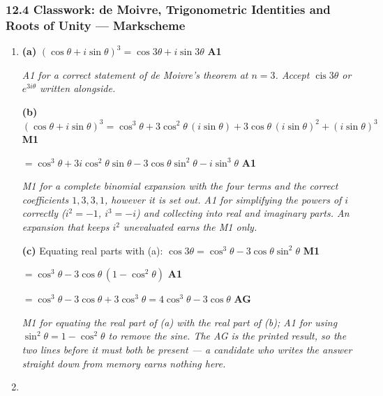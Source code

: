 \documentclass[12pt, twoside]{article}
\begin{document}
\subsubsection*{12.4 Classwork: de Moivre, Trigonometric Identities and Roots of Unity --- Markscheme}

\begin{enumerate}[itemsep=0.3cm]

\item[1.] [Maximum mark: 6]

\textbf{(a)} $(\cos\theta + i\sin\theta)^{3} = \cos 3\theta + i\sin 3\theta$
\hfill \textbf{A1}

\emph{A1 for a correct statement of de Moivre's theorem at $n = 3$. Accept
$\operatorname{cis}3\theta$ or $e^{3i\theta}$ written alongside.}

\textbf{(b)} $(\cos\theta + i\sin\theta)^{3}
= \cos^{3}\theta + 3\cos^{2}\theta\,(i\sin\theta)
+ 3\cos\theta\,(i\sin\theta)^{2} + (i\sin\theta)^{3}$ \hfill \textbf{M1}

$= \cos^{3}\theta + 3i\cos^{2}\theta\sin\theta - 3\cos\theta\sin^{2}\theta
- i\sin^{3}\theta$ \hfill \textbf{A1}

\emph{M1 for a complete binomial expansion with the four terms and the correct
coefficients $1, 3, 3, 1$, however it is set out. A1 for simplifying the powers
of $i$ correctly ($i^{2} = -1$, $i^{3} = -i$) and collecting into real and
imaginary parts. An expansion that keeps $i^{2}$ unevaluated earns the M1 only.}

\textbf{(c)} Equating real parts with (a):
$\cos 3\theta = \cos^{3}\theta - 3\cos\theta\sin^{2}\theta$ \hfill \textbf{M1}

$= \cos^{3}\theta - 3\cos\theta\,(1 - \cos^{2}\theta)$ \hfill \textbf{A1}

$= \cos^{3}\theta - 3\cos\theta + 3\cos^{3}\theta = 4\cos^{3}\theta - 3\cos\theta$
\hfill \textbf{AG}

\emph{M1 for equating the real part of (a) with the real part of (b); A1 for
using $\sin^{2}\theta = 1 - \cos^{2}\theta$ to remove the sine. The AG is the
printed result, so the two lines before it must both be present --- a candidate
who writes the answer straight down from memory earns nothing here.}

\newpage

\item[2.] [Maximum mark: 5]


\end{enumerate}
\end{document}
